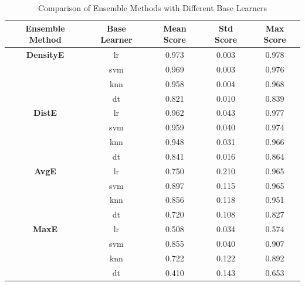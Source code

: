 \documentclass[lettersize,journal]{IEEEtran}
\begin{document}
	\begin{table}[H]
		
	    \begin{center}
			
			\caption{Comparison of Ensemble Methods with Different Base Learners}
			
			\label{tab:ensemble_comparison}
			
			\begin{tabular}{|c|c|c|c|c|}
				
				\hline 
				
				\textbf{Ensemble Method} & \textbf{Base Learner} & \textbf{Mean Score} & \textbf{Std Score} & \textbf{Max Score} \\
				
				\hline
				
				\textbf{DensityE} & lr & 0.973 & 0.003 & 0.978 \\
				
				& svm & 0.969 & 0.003 & 0.976 \\
				
				& knn & 0.958 & 0.004 & 0.968 \\
				
				& dt & 0.821 & 0.010 & 0.839 \\
				
				\hline 
				
				\textbf{DistE} & lr & 0.962 & 0.043 & 0.977 \\
				
				& svm & 0.959 & 0.040 & 0.974 \\
				
				& knn & 0.948 & 0.031 & 0.966 \\
				
				& dt & 0.841 & 0.016 & 0.864 \\
				
				\hline 
				
				\textbf{AvgE} & lr & 0.750 & 0.210 & 0.965 \\
				
				& svm & 0.897 & 0.115 & 0.965 \\
				
				& knn & 0.856 & 0.118 & 0.951 \\
				
				& dt & 0.720 & 0.108 & 0.827 \\
				
				\hline 
				
				\textbf{MaxE} & lr & 0.508 & 0.034 & 0.574 \\
				
				& svm & 0.855 & 0.040 & 0.907 \\
				
				& knn & 0.722 & 0.122 & 0.892 \\
				
				& dt & 0.410 & 0.143 & 0.653 \\
				
				\hline
				
			\end{tabular}
			
		\end{center}
		
	\end{table}
	
\end{document}
